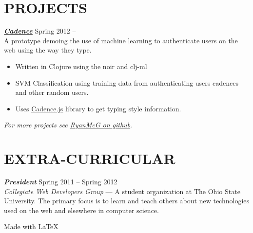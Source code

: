 \documentclass[line,letterpaper]{resume}
\begin{document}
\begin{resume}
    \vspace{-6pt}

    \section{\uppercase{Projects}}
    {\sl\textbf{\underline{\href{https://github.com/RyanMcG/Cadence}{Cadence}}}}
    \hfill Spring 2012 -- \\
    A prototype demoing the use of machine learning to authenticate users on the
    web using the way they type.
    \begin{itemize}
        \item Written in Clojure using the noir and clj-ml
        \item SVM Classification using training data from authenticating users
            cadences and other random users.
        \item Uses
            \underline{\href{https://github.com/RyanMcG/Cadence-js}{Cadence.js}}
            library to get typing style information.
    \end{itemize}

    \vspace{-6pt}
    \hfill \emph{For more projects see
    \underline{\href{https://github.com/RyanMcG}{RyanMcG on github}}}.

    \vspace{-15pt}

    \section{\uppercase{Extra-Curricular}}
    {\sl\textbf{President}} \hfill Spring 2011 -- Spring 2012\\
    \emph{Collegiate Web Developers Group} --- A student organization at The
    Ohio State University. The primary focus is to learn and teach others about
    new technologies used on the web and elsewhere in computer science.

\end{resume}

\vspace{34pt}

\hfill Made with \LaTeX{}
\end{document}
